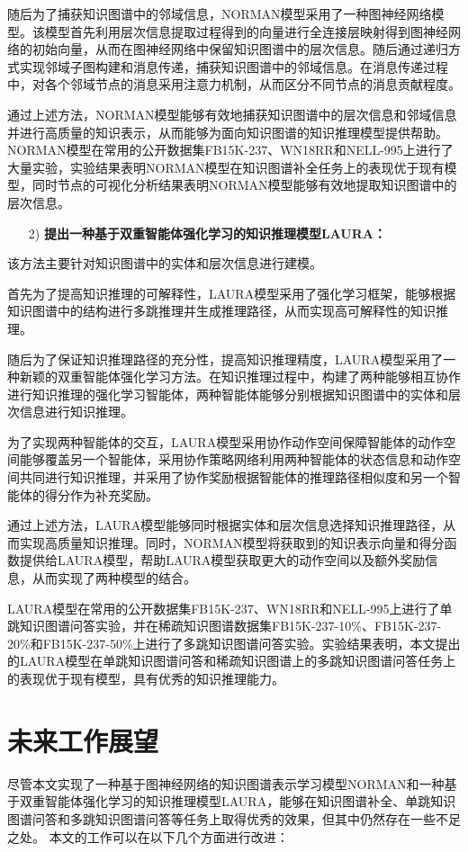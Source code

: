 \documentclass[algorithmlist, AutoFakeBold, AutoFakeSlant, figurelist, tablelist, nomlist, engineering, openany]{seuthesix} %
\begin{document}
随后为了捕获知识图谱中的邻域信息，NORMAN模型采用了一种图神经网络模型。该模型首先利用层次信息提取过程得到的向量进行全连接层映射得到图神经网络的初始向量，从而在图神经网络中保留知识图谱中的层次信息。随后通过递归方式实现邻域子图构建和消息传递，捕获知识图谱中的邻域信息。在消息传递过程中，对各个邻域节点的消息采用注意力机制，从而区分不同节点的消息贡献程度。

通过上述方法，NORMAN模型能够有效地捕获知识图谱中的层次信息和邻域信息并进行高质量的知识表示，从而能够为面向知识图谱的知识推理模型提供帮助。NORMAN模型在常用的公开数据集FB15K-237、WN18RR和NELL-995上进行了大量实验，实验结果表明NORMAN模型在知识图谱补全任务上的表现优于现有模型，同时节点的可视化分析结果表明NORMAN模型能够有效地提取知识图谱中的层次信息。

\begin{itemize}[leftmargin=*]
  \item [2)]\textbf{提出一种基于双重智能体强化学习的知识推理模型LAURA：}
\end{itemize}
  
该方法主要针对知识图谱中的实体和层次信息进行建模。

首先为了提高知识推理的可解释性，LAURA模型采用了强化学习框架，能够根据知识图谱中的结构进行多跳推理并生成推理路径，从而实现高可解释性的知识推理。

随后为了保证知识推理路径的充分性，提高知识推理精度，LAURA模型采用了一种新颖的双重智能体强化学习方法。在知识推理过程中，构建了两种能够相互协作进行知识推理的强化学习智能体，两种智能体能够分别根据知识图谱中的实体和层次信息进行知识推理。

为了实现两种智能体的交互，LAURA模型采用协作动作空间保障智能体的动作空间能够覆盖另一个智能体，采用协作策略网络利用两种智能体的状态信息和动作空间共同进行知识推理，并采用了协作奖励根据智能体的推理路径相似度和另一个智能体的得分作为补充奖励。

通过上述方法，LAURA模型能够同时根据实体和层次信息选择知识推理路径，从而实现高质量知识推理。同时，NORMAN模型将获取到的知识表示向量和得分函数提供给LAURA模型，帮助LAURA模型获取更大的动作空间以及额外奖励信息，从而实现了两种模型的结合。

LAURA模型在常用的公开数据集FB15K-237、WN18RR和NELL-995上进行了单跳知识图谱问答实验，并在稀疏知识图谱数据集FB15K-237-10\%、FB15K-237-20\%和FB15K-237-50\%上进行了多跳知识图谱问答实验。实验结果表明，本文提出的LAURA模型在单跳知识图谱问答和稀疏知识图谱上的多跳知识图谱问答任务上的表现优于现有模型，具有优秀的知识推理能力。

\section{未来工作展望}
尽管本文实现了一种基于图神经网络的知识图谱表示学习模型NORMAN和一种基于双重智能体强化学习的知识推理模型LAURA，能够在知识图谱补全、单跳知识图谱问答和多跳知识图谱问答等任务上取得优秀的效果，但其中仍然存在一些不足之处。
本文的工作可以在以下几个方面进行改进：
\end{document}
